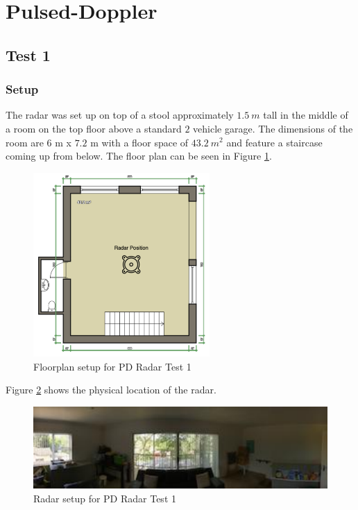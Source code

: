 \section{Pulsed-Doppler}
\subsection{Test 1}
\subsubsection{Setup}
The radar was set up on top of a stool approximately $1.5\ m$ tall in the middle of a room on the top floor above a standard $2$ vehicle garage. The dimensions of the room are $6$ m x $7.2$ m  with a floor space of $43.2\ m^2$ and feature a staircase coming up from below. The floor plan can be seen in Figure \ref{fig:floorplan}.

\begin{figure}[h!]
    \centering
    \includegraphics[width = 0.6\textwidth]{images/floorplan.pdf}
    \caption{Floorplan setup for PD Radar Test 1}\label{fig:floorplan}
\end{figure}

Figure \ref{fig:setupPDTest1} shows the physical location of the radar.

\begin{figure}[h!]
    \centering
    \includegraphics[width = 1\textwidth]{images/setupPDTest1.pdf}
    \caption{Radar setup for PD Radar Test 1}\label{fig:setupPDTest1}
\end{figure}

